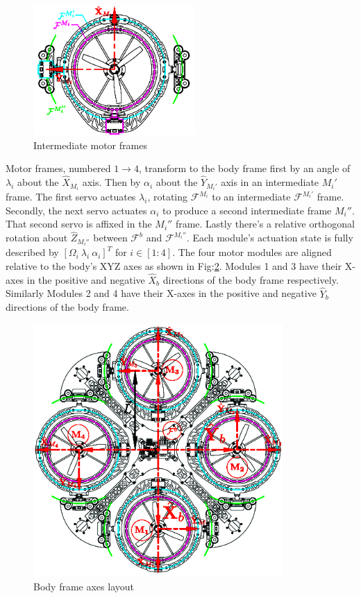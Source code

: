 \begin{minipage}{\textwidth}
\begin{figure}
\centering
\includegraphics[width=0.55\textwidth]{figs/motor-frame}
\caption{Intermediate motor frames}
\label{fig:motor-frame}
\end{figure}
\par
Motor frames, numbered $1\rightarrow 4$, transform to the body frame first by an angle of $\lambda_i$ about the $\hat{X}_{M_i}$ axis. Then by $\alpha_i$ about the $\hat{Y}_{M_i'}$ axis in an intermediate $M_i'$ frame. The first servo actuates $\lambda_i$, rotating $\mathcal{F}^{M_i}$ to an intermediate $\mathcal{F}^{M_i'}$ frame. Secondly, the next servo actuates $\alpha_i$ to produce a second intermediate frame $M_i''$. That second servo is affixed in the $M_i''$ frame. Lastly there's a relative orthogonal rotation about $\hat{Z}_{M_i''}$ between $\mathcal{F}^b$ and $\mathcal{F}^{M_i''}$. Each module's actuation state is fully described by $[\Omega_{i}~\lambda_{i}~\alpha_{i}]^{T}$ for $i\in [1:4]$. The four motor modules are aligned relative to the body's XYZ axes as shown in Fig:\ref{fig:body-frame}. Modules 1 and 3 have their X-axes in the positive and negative $\hat{X}_b$ directions of the body frame respectively. Similarly Modules 2 and 4 have their X-axes in the positive and negative $\hat{Y}_b$ directions of the body frame.
\end{minipage}
\par
\begin{figure}[htbp]
\centering
\includegraphics[width=0.85\textwidth]{figs/body-frame}
\caption{Body frame axes layout}
\label{fig:body-frame}
\end{figure}
